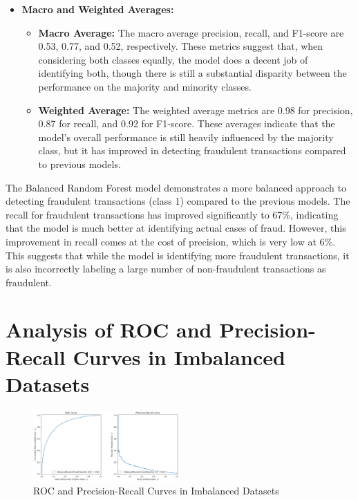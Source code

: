 \documentclass[12pt,a4paper]{report}
\begin{document}
\begin{itemize}
    \item \textbf{Macro and Weighted Averages:}
    \begin{itemize}
        \item \textbf{Macro Average:} The macro average precision, recall, and F1-score are 0.53, 0.77, and 0.52, respectively. These metrics suggest that, when considering both classes equally, the model does a decent job of identifying both, though there is still a substantial disparity between the performance on the majority and minority classes.
        \item \textbf{Weighted Average:} The weighted average metrics are 0.98 for precision, 0.87 for recall, and 0.92 for F1-score. These averages indicate that the model's overall performance is still heavily influenced by the majority class, but it has improved in detecting fraudulent transactions compared to previous models.
    \end{itemize}
\end{itemize}

The Balanced Random Forest model demonstrates a more balanced approach to detecting fraudulent transactions (class 1) compared to the previous models. The recall for fraudulent transactions has improved significantly to 67\%, indicating that the model is much better at identifying actual cases of fraud. However, this improvement in recall comes at the cost of precision, which is very low at 6\%. This suggests that while the model is identifying more fraudulent transactions, it is also incorrectly labeling a large number of non-fraudulent transactions as fraudulent.







\section{Analysis of ROC and Precision-Recall Curves in Imbalanced Datasets}

\begin{figure}[h]
    \centering
    \includegraphics[width=0.5\textwidth]{roc-pr_curve.png}
    \caption{ROC and Precision-Recall Curves in Imbalanced Datasets}
    \label{fig:rocprcurve}
\end{figure}
\end{document}
